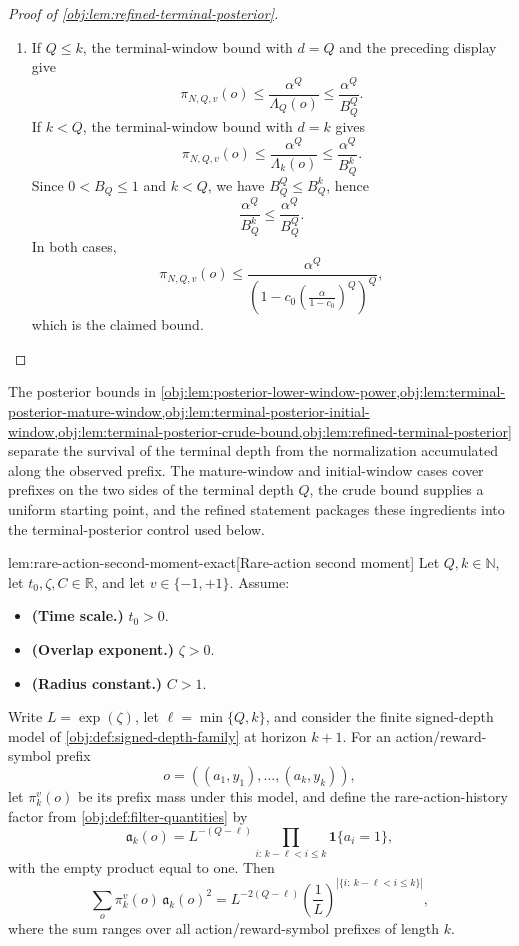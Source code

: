 \documentclass[11pt]{article}
\begin{document}
\begin{proof}[Proof of \cref{obj:lem:refined-terminal-posterior}]
\begin{enumerate}
\item
If \(Q\le k\), the terminal-window bound with \(d=Q\) and the preceding display give
\[
\pi_{N,Q,v}(o)
\le
\frac{\alpha^Q}{\Lambda_Q(o)}
\le
\frac{\alpha^Q}{B_Q^Q}.
\]
If \(k<Q\), the terminal-window bound with \(d=k\) gives
\[
\pi_{N,Q,v}(o)
\le
\frac{\alpha^Q}{\Lambda_k(o)}
\le
\frac{\alpha^Q}{B_Q^k}.
\]
Since \(0<B_Q\le1\) and \(k<Q\), we have \(B_Q^Q\le B_Q^k\), hence
\[
\frac{\alpha^Q}{B_Q^k}
\le
\frac{\alpha^Q}{B_Q^Q}.
\]
In both cases,
\[
\pi_{N,Q,v}(o)
\le
\frac{\alpha^Q}
{\left(1-c_0\left(\frac{\alpha}{1-c_0}\right)^Q\right)^Q},
\]
which is the claimed bound. %
\end{enumerate}
\end{proof}

The posterior bounds in \cref{obj:lem:posterior-lower-window-power,obj:lem:terminal-posterior-mature-window,obj:lem:terminal-posterior-initial-window,obj:lem:terminal-posterior-crude-bound,obj:lem:refined-terminal-posterior} separate the survival of the terminal depth from the normalization accumulated along the observed prefix. The mature-window and initial-window cases cover prefixes on the two sides of the terminal depth \(Q\), the crude bound supplies a uniform starting point, and the refined statement packages these ingredients into the terminal-posterior control used below.

\begin{lemmav}{lem:rare-action-second-moment-exact}[Rare-action second moment]
Let \(Q,k\in\mathbb N\), let \(t_0,\zeta,C\in\mathbb R\), and let \(v\in\{-1,+1\}\). Assume:
\begin{itemize}
\item \textbf{(Time scale.)} \(t_0>0\).
\item \textbf{(Overlap exponent.)} \(\zeta>0\).
\item \textbf{(Radius constant.)} \(C>1\).
\end{itemize}
Write \(L=\exp(\zeta)\), let \(\ell=\min\{Q,k\}\), and consider the finite signed-depth model of \cref{obj:def:signed-depth-family} at horizon \(k+1\). For an action/reward-symbol prefix
\[
o=((a_1,y_1),\ldots,(a_k,y_k)),
\]
let \(\pi_k^v(o)\) be its prefix mass under this model, and define the rare-action-history factor from \cref{obj:def:filter-quantities} by
\[
\mathfrak a_k(o)
=
L^{-(Q-\ell)}
\prod_{i:\,k-\ell<i\le k}\mathbf 1\{a_i=1\},
\]
with the empty product equal to one. Then
\[
\sum_{o}\pi_k^v(o)\,\mathfrak a_k(o)^2
=
L^{-2(Q-\ell)}
\left(\frac{1}{L}\right)^{|\{i:\ k-\ell<i\le k\}|},
\]
where the sum ranges over all action/reward-symbol prefixes of length \(k\).
\end{lemmav}
\end{document}
